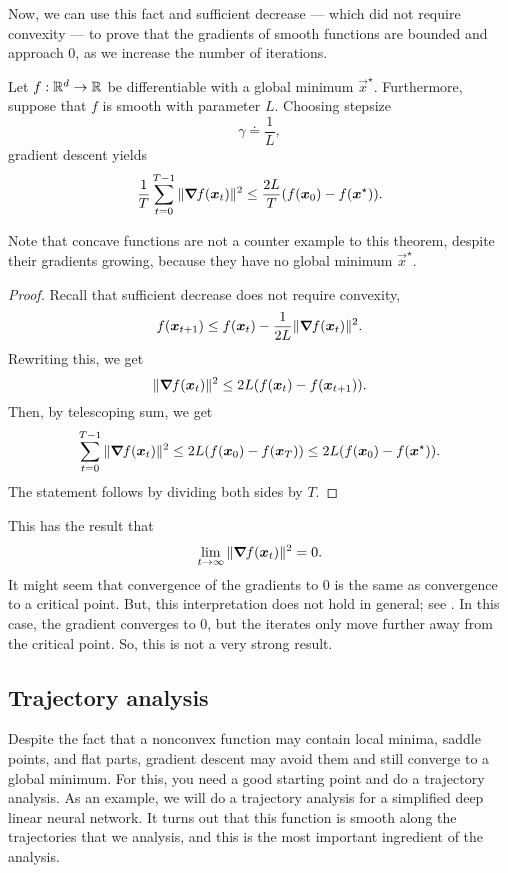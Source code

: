 Now, we can use this fact and sufficient decrease --- which did not require convexity --- to prove
that the gradients of smooth functions are bounded and approach 0, as we increase the number of
iterations.

\begin{theorem}
    Let $f: \mathbb{R}^d \to \mathbb{R}$ be differentiable with a global minimum $\vec{x}^\star$. Furthermore, suppose that $f$ is smooth with parameter $L$. Choosing stepsize \[
        \gamma \doteq \frac{1}{L},
    \]
    gradient descent yields \[
        \frac{1}{T} \sum_{t=0}^{T-1} \| \bm{\nabla}_{\! } f(\bm{x}_t) \|^2 \leq \frac{2L}{T} (f(\bm{x}_0) - f(\bm{x}^\star)).
    \]
\end{theorem}

\begin{remark}
    Note that concave functions are not a counter example to this theorem, despite their gradients
    growing, because they have no global minimum $\vec{x}^\star$.
\end{remark}

\begin{proof}
    Recall that sufficient decrease does not require convexity, \[
        f(\bm{x}_{t+1}) \leq f(\bm{x}_t) - \frac{1}{2L} \| \bm{\nabla}_{\! } f(\bm{x}_t) \|^2.
    \]
    Rewriting this, we get \[
        \| \bm{\nabla}_{\! } f(\bm{x}_t) \|^2 \leq 2L (f(\bm{x}_t) - f(\bm{x}_{t+1})).
    \]
    Then, by telescoping sum, we get \[
        \sum_{t=0}^{T-1} \| \bm{\nabla}_{\! } f(\bm{x}_t) \|^2 \leq 2L (f(\bm{x}_0) - f(\bm{x}_T)) \leq 2L (f(\bm{x}_0) - f(\bm{x}^\star)).
    \]
    The statement follows by dividing both sides by $T$.
\end{proof}

This has the result that \[
    \lim_{t \to \infty} \| \bm{\nabla}_{\! } f(\bm{x}_t) \|^2 = 0.
\]
It might seem that convergence of the gradients to 0 is the same as convergence to a critical
point. But, this interpretation does not hold in general; see . In this
case, the gradient converges to 0, but the iterates only move further away from the critical point.
So, this is not a very strong result.

\subsection{Trajectory analysis}

Despite the fact that a nonconvex function may contain local minima, saddle points, and flat parts,
gradient descent may avoid them and still converge to a global minimum. For this, you need a good
starting point and do a trajectory analysis. As an example, we will do a trajectory analysis for a
simplified deep linear neural network. It turns out that this function is smooth along the
trajectories that we analysis, and this is the most important ingredient of the analysis.

